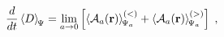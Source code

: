 \begin{equation}
\frac{d}{dt}
\left\langle
D
\right\rangle_{\scriptstyle \!  \Psi}
=
\lim_{a \rightarrow 0}
\left[
\left\langle
{\mathcal A}_{a}  ({\bf r})
\right\rangle_{\scriptstyle \!  \Psi_{a} }^{(<)}
+
\left\langle
{\mathcal A}_{a}  ({\bf r})
\right\rangle_{\scriptstyle \!  \Psi_{a} }^{(>)}
\right]
\;  ,
\label{eq:time_rate_of_dilation_op_ddim-EV_2D_ISP_reg}
\end{equation}

